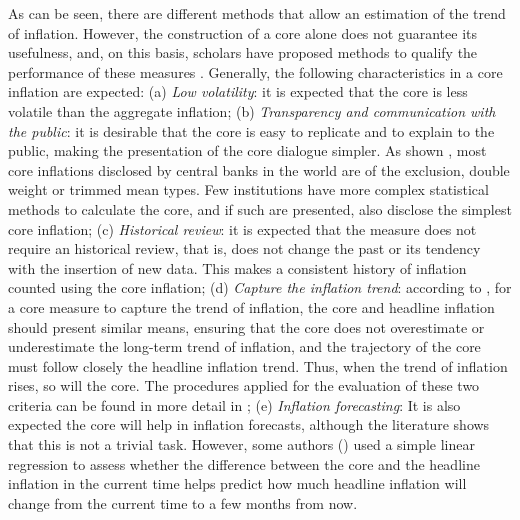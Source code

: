 \documentclass[10pt]{article}
\begin{document}
As can be seen, there are different methods that allow an estimation of the trend of inflation. However, the construction of a core alone does not guarantee its usefulness, and, on this basis, scholars have proposed methods to qualify the performance of these measures \citep{wynne,todd,frb}. Generally, the following characteristics in a core inflation are expected: (a) \textit{Low volatility}: it is expected that the core is less volatile than the aggregate inflation; (b) \textit{Transparency and communication with the public}: it is desirable that the core is easy to replicate and to explain to the public, making the presentation of the core dialogue simpler. As shown \cite{tito2014}, most core inflations disclosed by central banks in the world are of the exclusion, double weight or trimmed mean types. Few institutions have more complex statistical methods to calculate the core, and if such are presented, also disclose the simplest core inflation; (c) \textit{Historical review}: it is expected that the measure does not require an historical review, that is, does not change the past or its tendency with the insertion of new data. This makes a consistent history of inflation counted using the core inflation; (d) \textit{Capture the inflation trend}: according to \cite{todd}, for a core measure to capture the trend of inflation, the core and headline inflation should present similar means, ensuring that the core does not overestimate or underestimate the long-term trend of inflation, and the trajectory of the core must follow closely the headline inflation trend. Thus, when the trend of inflation rises, so will the core. The procedures applied for the evaluation of these two criteria can be found in more detail in \cite{todd,cogley2002,frb}; (e) \textit{Inflation forecasting}: It is also expected the core will help in inflation forecasts, although the literature shows that this is not a trivial task. However, some authors (\cite{todd,cogley2002,frb}) used a simple linear regression to assess whether the difference between the core and the headline inflation in the current time helps predict how much headline inflation will change from the current time to a few months from now.
\end{document}
